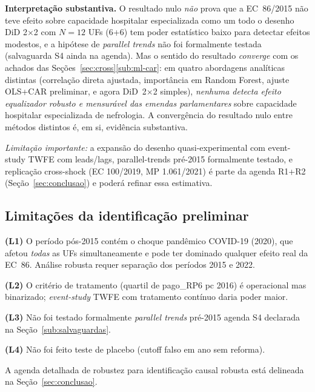 \documentclass[12pt,a4paper,oneside]{article}
\begin{document}
\textbf{Interpretação substantiva.} O resultado nulo \textit{não}
prova que a EC~86/2015 não teve efeito sobre capacidade
hospitalar especializada como um todo \textemdash{} o desenho
DiD 2$\times$2 com $N=12$ UFs (6+6) tem poder estatístico baixo
para detectar efeitos modestos, e a hipótese de \textit{parallel
trends} não foi formalmente testada (salvaguarda S4 ainda na
agenda). Mas o sentido do resultado \textit{converge} com os
achados das Seções~\ref{sec:cross}\textendash\ref{sub:ml-car}:
em quatro abordagens analíticas distintas (correlação direta
ajustada, importância em Random Forest, ajuste OLS+CAR
preliminar, e agora DiD~2$\times$2 simples), \textit{nenhuma
detecta efeito equalizador robusto e mensurável das emendas
parlamentares} sobre capacidade hospitalar especializada de
nefrologia. A convergência do resultado nulo entre métodos
distintos é, em si, evidência substantiva.

\textit{Limitação importante:} a expansão do desenho
quasi-experimental com event-study TWFE com leads/lags,
parallel-trends pré-2015 formalmente testado, e replicação
cross-shock (EC 100/2019, MP 1.061/2021) é parte da agenda R1+R2
(Seção~\ref{sec:conclusao}) e poderá refinar essa estimativa.

\subsection{Limitações da identificação preliminar}

\textbf{(L1)} O período pós-2015 contém o choque pandêmico
COVID-19 (2020), que afetou \textit{todas} as
UFs simultaneamente e pode ter dominado qualquer efeito real
da EC~86. Análise robusta requer separação dos períodos
2015 e 2022.

\textbf{(L2)} O critério de tratamento (quartil de pago\_RP6 pc
2016) é operacional mas binarizado;
\textit{event-study} TWFE com tratamento contínuo daria poder
maior.

\textbf{(L3)} Não foi testado formalmente \textit{parallel
trends} pré-2015 \textemdash{} agenda S4 declarada na
Seção~\ref{sub:salvaguardas}.

\textbf{(L4)} Não foi feito teste de placebo (cutoff falso em
ano sem reforma).

A agenda detalhada de robustez para identificação causal
robusta está delineada na Seção~\ref{sec:conclusao}.

\end{document}

